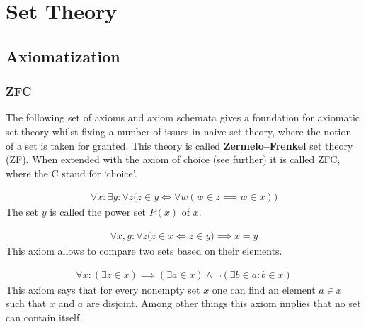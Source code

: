 \chapter{Set Theory}

\section{Axiomatization}\label{section:axiomatization}
\subsection{ZFC}

    The following set of axioms and axiom schemata gives a foundation for axiomatic set theory whilst fixing a number of issues in naive set theory, where the notion of a set is taken for granted. This theory is called \textbf{Zermelo--Frenkel} set theory (ZF). When extended with the axiom of choice (see further) it is called ZFC, where the C stand for `choice'.

    \begin{axiom}\label{set:power_set_axiom}
        \begin{gather}
            \forall x:\exists y:\forall z\bigl(z\in y\iff\forall w(w\in z\implies w\in x)\bigr)
        \end{gather}
        The set $y$ is called the power set $P(x)$ of $x$.
    \end{axiom}

    \begin{axiom}[Extensionality]
        \begin{gather}
            \forall x,y:\forall z\bigl(z\in x\iff z\in y\bigr)\implies x=y
        \end{gather}
        This axiom allows to compare two sets based on their elements.
    \end{axiom}

    \begin{axiom}
        \begin{gather}
            \forall x:(\exists z\in x)\implies(\exists a\in x)\land\neg(\exists b\in a:b\in x)
        \end{gather}
        This axiom says that for every nonempty set $x$ one can find an element $a\in x$ such that $x$ and $a$ are disjoint. Among other things this axiom implies that no set can contain itself.
    \end{axiom}

